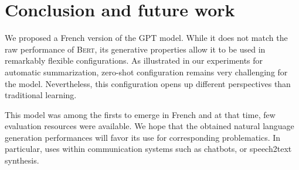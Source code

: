 \section{Conclusion and future work}

We proposed a French version of the GPT model. While it does not match the raw performance of \textsc{Bert}, its generative properties allow it to be used in remarkably flexible configurations. As illustrated in our experiments for automatic summarization, zero-shot configuration remains very challenging for the model. Nevertheless, this configuration opens up different perspectives than traditional learning.

This model was among the firsts to emerge in French and at that time, few evaluation resources were available. We hope that the obtained natural language generation performances will favor its use for corresponding problematics. In particular, uses within communication systems such as chatbots, or speech2text synthesis.



